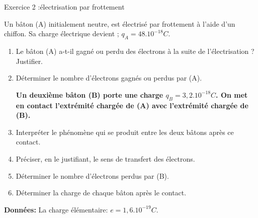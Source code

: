 \documentclass[12pt, french]{article}
\begin{document}
\begin{Box2}{Exercice 2 :électrisation par frottement}

Un bâton (A) initialement neutre, est électrisé par frottement à l’aide d’un chiffon. Sa charge
électrique devient ; $q_A = 48.10^{-18}C$.
\begin{enumerate}
	\item  Le bâton (A) a-t-il gagné ou perdu des électrons à la suite de l’électrisation ? Justifier.
	\item  Déterminer le nombre d’électrons gagnés ou perdus par (A).

		\textbf{Un deuxième bâton (B) porte une charge $q_B = 3,2. 10^{-18}C$. On met en contact l’extrémité chargée de (A)
avec l’extrémité chargée de (B).}

\item  Interpréter le phénomène qui se produit entre les deux bâtons après ce contact.
\item  Préciser, en le justifiant, le sens de transfert des électrons.

\item Déterminer le nombre d’électrons perdus par (B).
\item  Déterminer la charge de chaque bâton après le contact.
\end{enumerate}

\textbf{Données:} La charge élémentaire: $e = 1,6.10^{-19}C$.


\end{Box2}
\end{document}
